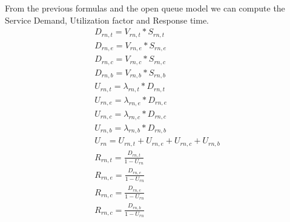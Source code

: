 \documentclass[11pt]{article}
\begin{document}
From the previous formulas and the open queue model we can compute the Service Demand, Utilization factor and Response time.
\begin{equation}
	\begin{array}{l}
		D_{rn, t} = V_{rn, t} * S_{rn, t} \\
		D_{rn, e} = V_{rn, e} * S_{rn, e} \\
		D_{rn, c} = V_{rn, c} * S_{rn, c} \\
		D_{rn, b} = V_{rn, b} * S_{rn, b} \\
		U_{rn, t} = \lambda_{rn, t} * D_{rn, t} \\
		U_{rn, e} = \lambda_{rn, e} * D_{rn, e} \\
		U_{rn, c} = \lambda_{rn, c} * D_{rn, c} \\
		U_{rn, b} = \lambda_{rn, b} * D_{rn, b} \\
		U_{rn} = U_{rn, t} + U_{rn, e} + U_{rn, c} + U_{rn, b} \\
		R_{rn, t} = \frac{D_{rn, t}}{1 - U_{rn}} \\
		R_{rn, e} = \frac{D_{rn, e}}{1 - U_{rn}} \\
		R_{rn, c} = \frac{D_{rn, c}}{1 - U_{rn}} \\
		R_{rn, c} = \frac{D_{rn, b}}{1 - U_{rn}} \\
	\end{array}
\end{equation}
\end{document}
